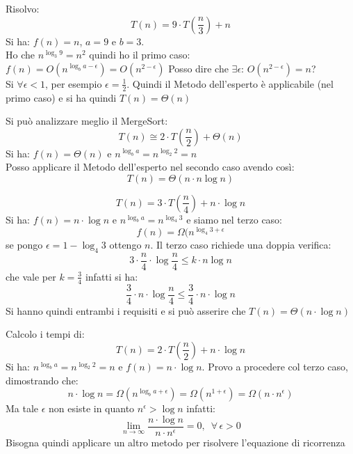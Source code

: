 \documentclass[a4paper,12pt,oneside,tikz]{book}
\begin{document}
\begin{esempio}
	Risolvo:
	$$T(n)=9\cdot T\left(\frac{n}{3}\right)+n$$
	Si ha: $f(n)=n$, $a=9$ e $b=3$.\\
	Ho che $n^{\log_3 9}=n^2$ quindi ho il primo caso:\\
	$f(n)=O(n^{\log_b a -\epsilon})=O(n^{2-\epsilon})$
	Posso dire che $\exists \epsilon:\, O(n^{2-\epsilon})=n$?\\
	Si $\forall \epsilon<1$, per esempio $\epsilon=\frac{1}{2}$. Quindi il Metodo dell'esperto è applicabile (nel primo caso) e si ha quindi $T(n)=\Theta(n)$
\end{esempio}
\newpage
\begin{esempio}
	Si può analizzare meglio il MergeSort:
	$$T(n)\cong 2\cdot T\left(\frac{n}{2}\right)+\Theta(n)$$
	Si ha: $f(n)=\Theta(n)$ e $n^{\log_b a}=n^{\log_2 2 }=n$\\
	Posso applicare il Metodo dell'esperto nel secondo caso avendo così: $$T(n)=\Theta(n\cdot n\log n)$$
\end{esempio}
\begin{esempio}
	$$T(n)=3\cdot T\left(\frac{n}{4}\right)+n\cdot \log n$$
	Si ha: $f(n)=n\cdot \log n$ e $n^{\log_b a}=n^{\log_4 3}$ e siamo nel terzo caso:
	$$f(n)=\Omega(n^{\log_4 3+\epsilon}$$
	se pongo $\epsilon=1-\log_4 3$ ottengo $n$.
	Il terzo caso richiede una doppia verifica:
	$$3\cdot \frac{n}{4}\cdot\log \frac{n}{4}\leq k\cdot n\log n$$
	che vale per $k=\frac{3}{4}$ infatti si ha:
	$$\frac{3}{4}\cdot n\cdot\log \frac{n}{4}\leq \frac{3}{4} \cdot n\cdot \log n$$
	Si hanno quindi entrambi i requisiti e si può asserire che $T(n)=\Theta(n\cdot\log n)$
\end{esempio}
\begin{esempio}
	Calcolo i tempi di:
	$$T(n)=2\cdot T\left(\frac{n}{2}\right)+n\cdot\log n$$
	Si ha: $n^{\log_b a }=n^{\log_2 2 }=n$ e $f(n)=n\cdot\log n$.
	Provo a procedere col terzo caso, dimostrando che: $$n\cdot\log n=\Omega(n^{\log_b a +\epsilon})=\Omega(n^{1+\epsilon})=\Omega(n\cdot n^\epsilon)$$
	Ma tale $\epsilon$ non esiste in quanto $n^\epsilon>\log n$ infatti:
	$$\lim_{n\rightarrow \infty}\frac{n\cdot\log n}{n\cdot n^\epsilon}=0,\,\,\, \forall\, \epsilon>0$$
	Bisogna quindi applicare un altro metodo per risolvere l'equazione di ricorrenza
\end{esempio}
\newpage
\end{document}
